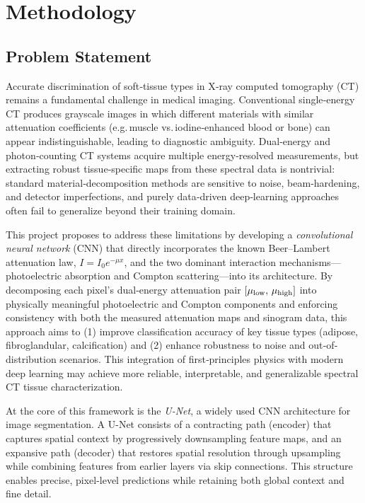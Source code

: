 \section{Methodology}

\subsection{Problem Statement}\label{subsec:problem_Statement}

Accurate discrimination of soft‐tissue types in X‐ray computed tomography (CT) remains a
fundamental challenge in medical imaging. Conventional single‐energy CT produces grayscale
images in which different materials with similar attenuation coefficients (e.g.\,muscle 
vs.\,iodine‐enhanced blood or bone) can appear indistinguishable, leading to diagnostic 
ambiguity. Dual‐energy and photon‐counting CT systems acquire multiple energy‐resolved 
measurements, but extracting robust tissue‐specific maps from these spectral data is 
nontrivial: standard material‐decomposition methods are sensitive to noise, beam‐hardening, 
and detector imperfections, and purely data‐driven deep‐learning approaches often fail to 
generalize beyond their training domain.

This project proposes to address these limitations by developing a \emph{convolutional neural network} 
(CNN) that directly incorporates the known Beer–Lambert attenuation law, $I = I_0 e^{-\mu x}$, and the
two dominant interaction mechanisms—photoelectric absorption and Compton scattering—into its 
architecture. By decomposing each pixel’s dual‐energy attenuation pair \([\mu_{\rm low},\,
\mu_{\rm high}]\) into physically meaningful photoelectric and Compton components and enforcing 
consistency with both the measured attenuation maps and sinogram data, this approach aims to (1)
improve classification accuracy of key tissue types (adipose, fibroglandular, calcification) and (2) 
enhance robustness to noise and out‐of‐distribution scenarios. This integration of first‐principles 
physics with modern deep learning may achieve more reliable, interpretable, and generalizable 
spectral CT tissue characterization.

At the core of this framework is the \emph{U-Net}, a widely used CNN architecture for image segmentation. 
A U-Net consists of a contracting path (encoder) that captures spatial context by progressively 
downsampling feature maps, and an expansive path (decoder) that restores spatial resolution through 
upsampling while combining features from earlier layers via skip connections. This structure enables 
precise, pixel-level predictions while retaining both global context and fine detail.

